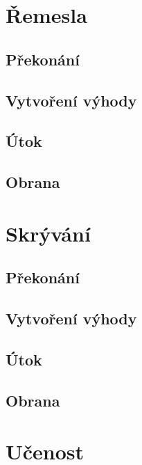 \documentclass[../main.tex]{subfiles}
\begin{document}
\section{Řemesla}
\label{sec:remesla}

\subsection*{Překonání}
\label{subsec:remesla-prekonani}
\prekonani

\subsection*{Vytvoření výhody}
\label{subsec:remesla-vytvoreni}
\vytvoreni

\subsection*{Útok}
\label{subsec:remesla-utok}
\utok

\subsection*{Obrana}
\label{subsec:remesla-obrana}
\obrana

\section{Skrývání}
\label{sec:skryvani}

\subsection*{Překonání}
\label{subsec:skryvani-prekonani}
\prekonani

\subsection*{Vytvoření výhody}
\label{subsec:skryvani-vytvoreni}
\vytvoreni

\subsection*{Útok}
\label{subsec:skryvani-utok}
\utok

\subsection*{Obrana}
\label{subsec:skryvani-obrana}

\section{Učenost}
\label{sec:ucenost}
\end{document}
